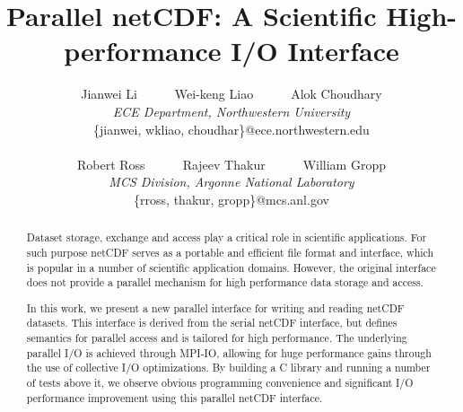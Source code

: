 \documentclass[10pt,twocolumn]{article}          %
\begin{document}
\title{Parallel netCDF: A Scientific High-performance I/O Interface}


\author{
  Jianwei Li~~~~~~Wei-keng Liao~~~~~~Alok Choudhary \\
  {\em ECE Department, Northwestern University} \\
  \{jianwei, wkliao, choudhar\}@ece.northwestern.edu \\
  \\
  Robert Ross~~~~~~Rajeev Thakur~~~~~~William Gropp \\
  {\em MCS Division, Argonne National Laboratory} \\
  \{rross, thakur, gropp\}@mcs.anl.gov
}

\maketitle

\begin{abstract}

Dataset storage, exchange and access play a critical role in scientific applications. For such
purpose netCDF serves as a portable and efficient file format and interface, which is popular in a
number of scientific application domains. However, the original interface does not provide a
parallel mechanism for high performance data storage and access.

In this work, we present a new parallel interface for writing and reading netCDF datasets. This
interface is derived from the serial netCDF interface, but defines semantics for parallel access
and is tailored for high performance. The underlying parallel I/O is achieved through MPI-IO,
allowing for huge performance gains through the use of collective I/O optimizations. By building a
C library and running a number of tests above it, we observe obvious programming convenience and
significant I/O performance improvement using this parallel netCDF interface.

\end{abstract}
\end{document}
